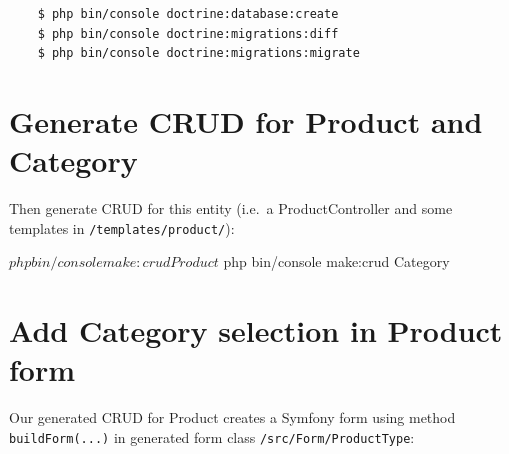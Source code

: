 \documentclass[a4paperpaper,openright]{book}
\newenvironment{Shaded}{}{}
\newcommand{\ExtensionTok}[1]{#1}
\newcommand{\KeywordTok}[1]{\textcolor[rgb]{0.00,0.44,0.13}{\textbf{#1}}}
\newcommand{\NormalTok}[1]{#1}
\newcommand{\OtherTok}[1]{\textcolor[rgb]{0.00,0.44,0.13}{#1}}
\newcommand{\StringTok}[1]{\textcolor[rgb]{0.25,0.44,0.63}{#1}}
\begin{document}
\begin{verbatim}
    $ php bin/console doctrine:database:create
    $ php bin/console doctrine:migrations:diff
    $ php bin/console doctrine:migrations:migrate
\end{verbatim}

\hypertarget{generate-crud-for-product-and-category}{%
\section{Generate CRUD for Product and
Category}\label{generate-crud-for-product-and-category}}

Then generate CRUD for this entity (i.e.~a ProductController and some
templates in \texttt{/templates/product/}):

\begin{Shaded}
\begin{Highlighting}[]
\NormalTok{    $ }\ExtensionTok{php}\NormalTok{ bin/console make:crud Product}
\NormalTok{    $ }\ExtensionTok{php}\NormalTok{ bin/console make:crud Category}
\end{Highlighting}
\end{Shaded}

\hypertarget{add-category-selection-in-product-form}{%
\section{Add Category selection in Product
form}\label{add-category-selection-in-product-form}}

Our generated CRUD for Product creates a Symfony form using method
\texttt{buildForm(...)} in generated form class
\texttt{/src/Form/ProductType}:

\begin{Shaded}
\end{Shaded}
\end{document}
